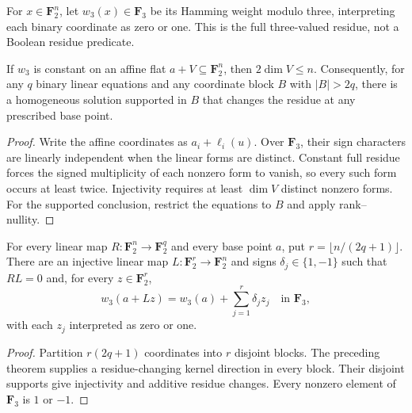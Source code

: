 \begin{definition}
  \label{def:lowerbounds-algebraic-modthree-residue}
  \leanok
  For $x\in\mathbf F_2^n$, let $w_3(x)\in\mathbf F_3$ be its Hamming weight
  modulo three, interpreting each binary coordinate as zero or one.
  This is the full three-valued residue, not a Boolean residue predicate.
\end{definition}

\begin{theorem}
  \label{thm:lowerbounds-algebraic-modthree-half-dimension}
  \leanok
  If $w_3$ is constant on an affine flat $a+V\subseteq\mathbf F_2^n$, then
  $2\dim V\le n$. Consequently, for any $q$ binary linear equations and any
  coordinate block $B$ with $|B|>2q$, there is a homogeneous solution supported
  in $B$ that changes the residue at any prescribed base point.
\end{theorem}
\begin{proof}
  \leanok
  Write the affine coordinates as $a_i+\ell_i(u)$. Over $\mathbf F_3$, their
  sign characters are linearly independent when the linear forms are distinct.
  Constant full residue forces the signed multiplicity of each nonzero form
  to vanish, so every such form occurs at least twice. Injectivity requires at
  least $\dim V$ distinct nonzero forms. For the supported conclusion, restrict
  the equations to $B$ and apply rank--nullity.
\end{proof}

\begin{theorem}
  \label{thm:lowerbounds-algebraic-modthree-cube}
  \leanok
  For every linear map $R:\mathbf F_2^n\to\mathbf F_2^q$ and every base point
  $a$, put $r=\lfloor n/(2q+1)\rfloor$. There are an injective linear map
  $L:\mathbf F_2^r\to\mathbf F_2^n$ and signs $\delta_j\in\{1,-1\}$ such that
  $RL=0$ and, for every $z\in\mathbf F_2^r$,
  \[
    w_3(a+Lz)=w_3(a)+\sum_{j=1}^r\delta_j z_j\quad\text{in }\mathbf F_3,
  \]
  with each $z_j$ interpreted as zero or one.
\end{theorem}
\begin{proof}
  \leanok
  Partition $r(2q+1)$ coordinates into $r$ disjoint blocks. The preceding
  theorem supplies a residue-changing kernel direction in every block.
  Their disjoint supports give injectivity and additive residue changes.
  Every nonzero element of $\mathbf F_3$ is $1$ or $-1$.
\end{proof}

